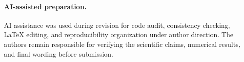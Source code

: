 \documentclass[11pt,a4paper]{article}
\theoremstyle{definition}
\numberwithin{equation}{section}   %
\begin{document}
\paragraph{AI-assisted preparation.}
AI assistance was used during revision for code audit, consistency checking,
LaTeX editing, and reproducibility organization under author direction. The
authors remain responsible for verifying the scientific claims, numerical
results, and final wording before submission.



\end{document}
